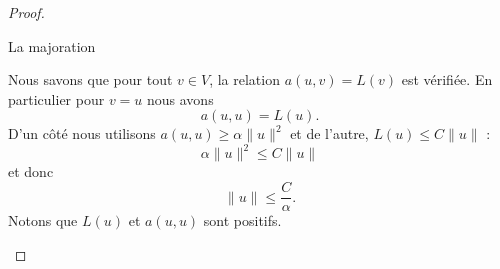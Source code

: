 \begin{proof}
\begin{subproof}
            \item[La majoration]

                Nous savons que pour tout \( v\in V\), la relation \( a(u,v)=L(v)\) est vérifiée. En particulier pour \( v=u\) nous avons
                \begin{equation}
                    a(u,u)=L(u).
                \end{equation}
                D'un côté nous utilisons \( a(u,u)\geq \alpha\| u \|^2\) et de l'autre, \( L(u)\leq C\| u \|\) :
                \begin{equation}
                    \alpha\| u \|^2\leq C\| u \|
                \end{equation}
                et donc
                \begin{equation}
                    \| u \|\leq \frac{ C }{ \alpha }.
                \end{equation}
                Notons que \( L(u)\) et \( a(u,u)\) sont positifs.
    \end{subproof}
\end{proof}
